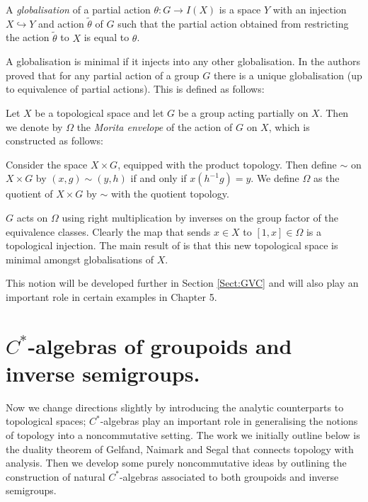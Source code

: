 \begin{example}
\begin{definition}
A \textit{globalisation} of a partial action $\theta: G \rightarrow I(X)$ is a space $Y$ with an injection $X \hookrightarrow Y$ and action $\tilde{\theta}$ of $G$ such that the partial action obtained from restricting the action $\tilde{\theta}$ to $X$ is equal to $\theta$. 
\end{definition}

A globalisation is minimal if it injects into any other globalisation. In \cite{MR2041539} the authors proved that for any partial action of a group $G$ there is a unique globalisation (up to equivalence of partial actions). This is defined as follows:

\begin{definition}
Let $X$ be a topological space and let $G$ be a group acting partially on $X$. Then we denote by $\Omega$ the \textit{Morita envelope} of the action of $G$ on $X$, which is constructed as follows:

Consider the space $X\times G$, equipped with the product topology. Then define $\sim$ on $X\times G$ by $(x,g)\sim (y,h)$ if and only if $x(h^{-1}g)=y$. We define $\Omega$ as the quotient of $X\times G$ by $\sim$ with the quotient topology. 

$G$ acts on $\Omega$ using right multiplication by inverses on the group factor of the equivalence classes. Clearly the map that sends $x \in X$ to $[1,x] \in \Omega$ is a topological injection. The main result of \cite{MR2041539} is that this new topological space is minimal amongst globalisations of $X$.
\end{definition}

This notion will be developed further in Section \ref{Sect:GVC} and will also play an important role in certain examples in Chapter 5.

\section{\texorpdfstring{$C^{*}$}{C*}-algebras of groupoids and inverse semigroups.}
Now we change directions slightly by introducing the analytic counterparts to topological spaces; $C^{*}$-algebras play an important role in generalising the notions of topology into a noncommutative setting. The work we initially outline below is the duality theorem of Gelfand, Naimark and Segal that connects topology with analysis. Then we develop some purely noncommutative ideas by outlining the construction of natural $C^{*}$-algebras associated to both groupoids and inverse semigroups.


\end{example}
